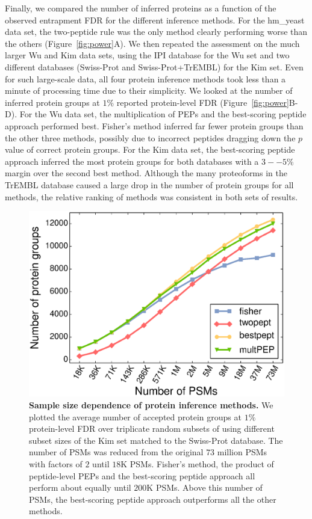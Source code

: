 \documentclass{article}
\begin{document}
Finally, we compared the number of inferred proteins as a function of
the observed entrapment FDR for the different inference methods.  For
the hm\_yeast data set, the two-peptide rule was the only method
clearly performing worse than the others (Figure~\ref{fig:power}A). We
then repeated the assessment on the much larger Wu and Kim data sets,
using the IPI database for the Wu set and two different databases
(Swiss-Prot and Swiss-Prot+TrEMBL) for the Kim set. Even for such
large-scale data, all four protein inference methods took less than a
minute of processing time due to their simplicity. We looked at the
number of inferred protein groups at $1\%$ reported protein-level FDR
(Figure~\ref{fig:power}B-D). For the Wu data set, the multiplication
of PEPs and the best-scoring peptide approach performed best. Fisher's
method inferred far fewer protein groups than the other three methods,
possibly due to incorrect peptides dragging down the $p$ value of
correct protein groups. For the Kim data set, the best-scoring peptide
approach inferred the most protein groups for both databases with a
$3--5\%$ margin over the second best method. Although the many
proteoforms in the TrEMBL database caused a large drop in the number
of protein groups for all methods, the relative ranking of methods was
consistent in both sets of results. 

\begin{figure}
\centering
\includegraphics[width=0.6\linewidth]
{./img/kim-downsampling-performance}
  \caption{{\bf Sample size dependence of protein inference methods.}
    We plotted the average number of accepted protein groups at $1\%$
    protein-level FDR over triplicate random subsets of using
    different subset sizes of the Kim set matched to the Swiss-Prot
    database.  The number of PSMs was reduced from the original $73$
    million PSMs with factors of $2$ until $18$K PSMs. Fisher's
    method, the product of peptide-level PEPs and the best-scoring
    peptide approach all perform about equally until $200$K
    PSMs. Above this number of PSMs, the best-scoring peptide approach
    outperforms all the other methods.}
  \label{fig:power-downsample}
\end{figure}
\end{document}
